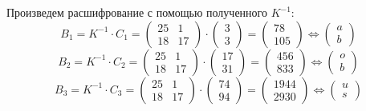 \documentclass[a4paper]{article}
\begin{document}
  Произведем расшифрование с помощью полученного $K^{-1}$:
  \begin{equation}
    B_1 = K^{-1}\cdot C_1 = \begin{pmatrix}
        25 & 1 \\ 18 & 17
    \end{pmatrix} \cdot \begin{pmatrix}
        3 \\ 3
    \end{pmatrix} = \begin{pmatrix}
        78 \\ 105
    \end{pmatrix} \Leftrightarrow \begin{pmatrix}
        a \\ b
    \end{pmatrix}
  \end{equation}
  \begin{equation}
    B_2 = K^{-1}\cdot C_2 = \begin{pmatrix}
        25 & 1 \\ 18 & 17
    \end{pmatrix} \cdot \begin{pmatrix}
        17 \\ 31
    \end{pmatrix} = \begin{pmatrix}
        456 \\ 833
    \end{pmatrix} \Leftrightarrow \begin{pmatrix}
        o \\ b
    \end{pmatrix} 
  \end{equation}
  \begin{equation}
    B_3 = K^{-1}\cdot C_3 = \begin{pmatrix}
        25 & 1 \\ 18 & 17
    \end{pmatrix} \cdot \begin{pmatrix}
        74 \\ 94
    \end{pmatrix} = \begin{pmatrix}
        1944 \\ 2930
    \end{pmatrix} \Leftrightarrow \begin{pmatrix}
        u \\ s
    \end{pmatrix} 
  \end{equation}
\end{document}

